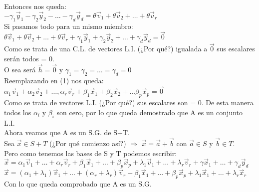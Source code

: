 \documentclass[11pt]{article}
\begin{document}
Entonces nos queda: \\
$- \gamma_1\vec{y}_1 - \gamma_2\vec{y}_2 - \hdots - \gamma_d\vec{y}_d = \theta \vec{v}_1 + \theta\vec{v}_2 + \hdots + \theta\vec{v}_r $\\
Si pasamos todo para un mismo miembro:\\
$ \theta \vec{v}_1 + \theta\vec{v}_2 + \hdots + \theta\vec{v}_r + \gamma_1\vec{y}_1 + \gamma_2\vec{y}_2 + \hdots + \gamma_d\vec{y}_d = \vec{0}$\\
Como se trata de una C.L. de vectores L.I. (¿Por qué?) igualada a $\vec{0}$ sus escalares serán todos = 0.\\
O sea será $\vec{h} = \vec{0}$ y $\gamma_1 = \gamma_2 = \hdots = \gamma_d = 0$\\Reemplazando en (1) nos queda:  \\
$\alpha_1\vec{v}_1 + \alpha_2\vec{v}_2 + \hdots, \alpha_r\vec{v}_r + \beta_1\vec{x}_1 + \beta_2\vec{x}_2 + \hdots \beta_p\vec{x}_p  = \vec{0}$\\
Como se trata de vectores L.I. (¿Por qué?) sus escalares son = 0. De esta manera todos los $\alpha_i$ y $\beta_i$ son cero, por lo que queda demostrado que A es un conjunto L.I.\\
Ahora veamos que A es un S.G. de S+T. \\
Sea $\vec{x} \in S+T$ (¿Por qué comienzo así?) $\Rightarrow$ $\vec{x} = \vec{a} + \vec{b}$ con $\vec{a} \in S$ y $\vec{b} \in T$. \\
Pero como tenemos las bases de S y T podemos escribir: \\
$\vec{x} = \alpha_1 \vec{v}_1 + \hdots + \alpha_r \vec{v}_r + \beta_1\vec{x}_1 + \hdots + \beta_p \vec{x}_p + \lambda_1\vec{v}_1 + \hdots + \lambda_r\vec{v}_r + \gamma\vec{x}_1 + \hdots + \gamma_d \vec{y}_d $\\
$\vec{x} = (\alpha_1 + \lambda_1) \vec{v}_1 + \hdots + (\alpha_r + \lambda_r) \vec{v}_r + \beta_1\vec{x}_1 + \hdots + \beta_p \vec{x}_p + \lambda_1\vec{x}_1 + \hdots + \lambda_r\vec{x}_r$\\
Con lo que queda comprobado que A es un S.G.
\end{document}
